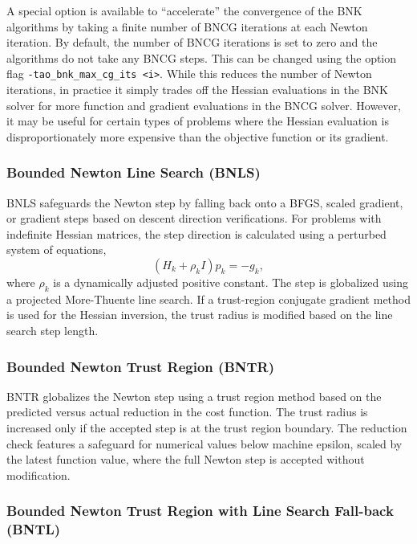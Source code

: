 A special option is available to ``accelerate'' the convergence of the BNK algorithms by taking a finite 
number of BNCG iterations at each Newton iteration. By default, the number of BNCG iterations is set to zero 
and the algorithms do not take any BNCG steps. This can be changed using the option flag 
{\tt -tao\_bnk\_max\_cg\_its <i>}. While this reduces the number of Newton iterations, in practice it simply 
trades off the Hessian evaluations in the BNK solver for more function and gradient evaluations in the BNCG 
solver. However, it may be useful for certain types of problems where the Hessian evaluation is 
disproportionately more expensive than the objective function or its gradient.

\subsubsection{Bounded Newton Line Search (BNLS)}\label{sec:bnls}

BNLS safeguards the Newton step by falling back onto a BFGS, scaled gradient, or gradient 
steps based on descent direction verifications. For problems with indefinite Hessian matrices, 
the step direction is calculated using a perturbed system of equations,
\[
(H_k + \rho_k I)p_k = -g_k,
\]
where $\rho_k$ is a dynamically adjusted positive constant. The step is globalized using a 
projected More-Thuente line search. If a trust-region conjugate gradient method is used for the 
Hessian inversion, the trust radius is modified based on the line search step length.

\subsubsection{Bounded Newton Trust Region (BNTR)}\label{sec:bntr}

BNTR globalizes the Newton step using a trust region method based on the predicted versus 
actual reduction in the cost function. The trust radius is increased only if the accepted 
step is at the trust region boundary. The reduction check features a safeguard for numerical 
values below machine epsilon, scaled by the latest function value, where the full Newton step 
is accepted without modification.

\subsubsection{Bounded Newton Trust Region with Line Search Fall-back (BNTL)}\label{sec:bntr}

